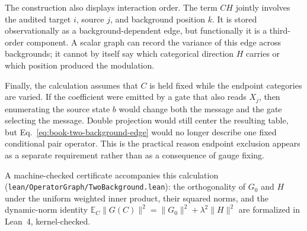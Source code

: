 The construction also displays interaction order.  The term $CH$ jointly involves the audited
target $i$, source $j$, and background position $k$.  It is stored observationally as a
background-dependent edge, but functionally it is a third-order component.  A scalar graph can
record the variance of this edge across backgrounds; it cannot by itself say which categorical
direction $H$ carries or which position produced the modulation.

Finally, the calculation assumes that $C$ is held fixed while the endpoint categories are varied.
If the coefficient were emitted by a gate that also reads $X_j$, then enumerating the source state
$b$ would change both the message and the gate selecting the message.  Double projection would
still center the resulting table, but Eq.~\ref{eq:book-two-background-edge} would no longer describe
one fixed conditional pair operator.  This is the practical reason endpoint exclusion appears as a
separate requirement rather than as a consequence of gauge fixing.

A machine-checked certificate accompanies this calculation
(\texttt{lean/OperatorGraph/TwoBackground.lean}): the orthogonality of $G_0$
and $H$ under the uniform weighted inner product, their squared norms, and
the dynamic-norm identity $\mathbb E_C\|G(C)\|^2 = \|G_0\|^2 +
\lambda^2\|H\|^2$ are formalized in Lean~4, kernel-checked.
